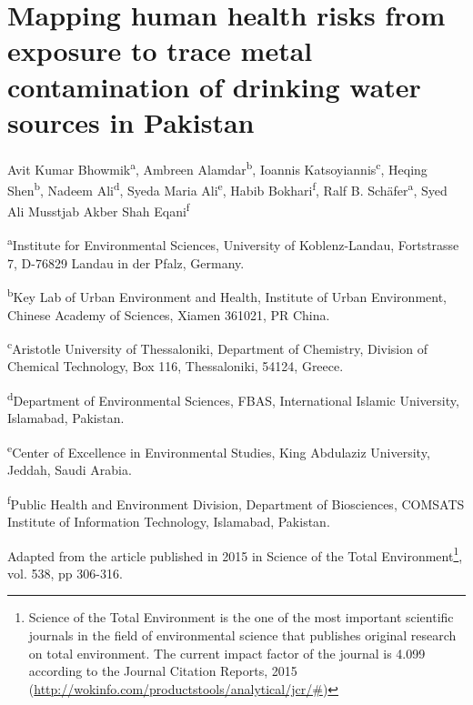 \chapter{Mapping human health risks from exposure to trace metal contamination of drinking water sources in Pakistan}
\label{chapter5}

Avit Kumar Bhowmik\textsuperscript{a}, Ambreen Alamdar\textsuperscript{b}, Ioannis Katsoyiannis\textsuperscript{c}, Heqing Shen\textsuperscript{b}, Nadeem Ali\textsuperscript{d}, Syeda Maria Ali\textsuperscript{e}, Habib Bokhari\textsuperscript{f}, Ralf B. Schäfer\textsuperscript{a}, Syed Ali Musstjab Akber Shah Eqani\textsuperscript{f}\\[.5cm]

\small

\textsuperscript{a}Institute for Environmental Sciences, University of Koblenz-Landau, Fortstrasse 7, D-76829 Landau in der Pfalz, Germany.

\textsuperscript{b}Key Lab of Urban Environment and Health, Institute of Urban Environment, Chinese Academy of Sciences, Xiamen 361021, PR China.

\textsuperscript{c}Aristotle University of Thessaloniki, Department of Chemistry, Division of Chemical Technology, Box 116, Thessaloniki, 54124, Greece.

\textsuperscript{d}Department of Environmental Sciences, FBAS, International Islamic University, Islamabad, Pakistan.

\textsuperscript{e}Center of Excellence in Environmental Studies, King Abdulaziz University, Jeddah, Saudi Arabia.

\textsuperscript{f}Public Health and Environment Division, Department of Biosciences, COMSATS Institute of Information Technology, Islamabad, Pakistan.\\[1cm]

\medskip

\normalsize
\noindent Adapted from the article published in 2015 in Science of the Total Environment\footnote{Science of the Total Environment is the one of the most important scientific journals in the field of environmental science that publishes original research on total environment. The current impact factor of the journal is 4.099 according to the Journal Citation Reports, 2015 (\href{http://wokinfo.com/products_tools/analytical/jcr/#}{http://wokinfo.com/products\textunderscore tools/analytical/jcr/#})}, vol. 538, pp 306-316.\\[.5cm]

